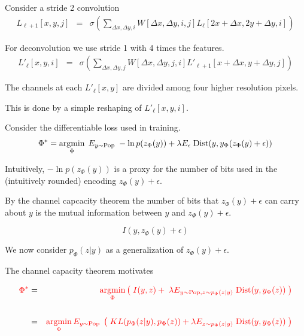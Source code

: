 {Consider a stride 2 convolution
\begin{eqnarray*}
  L_{\ell+1}[x,y,j] & = & \sigma\left(\sum_{\Delta x,\Delta y,i}   W[\Delta x, \Delta y, i,j] L_\ell[2x + \Delta x, 2y + \Delta y, i]\right)
\end{eqnarray*}

\vfill
For deconvolution we use stride 1 with 4 times the features.
\begin{eqnarray*}
  L'_\ell[x,y,i] & = & \sigma\left(\sum_{\Delta x,\Delta y,j}   W[\Delta x, \Delta y, j,i] L'_{\ell+1}[x + \Delta x, y + \Delta y, j]\right)
\end{eqnarray*}

\vfill
The channels at each $L'_\ell[x,y]$ are divided among four higher resolution pixels.

\vfill
This is done by a simple reshaping of $L'_\ell[x,y,i]$.


Consider the differentiable loss used in training.
{\color{red} $$\Phi^* = \operatorname*{argmin}_\Phi \;E_{y \sim \mathrm{Pop}}\;- \ln p(z_\Phi(y)) + \lambda E_\epsilon\; \mathrm{Dist}(y,y_\Phi(z_\Phi(y) + \epsilon))$$}

Intuitively, {\color{red} $- \ln p(z_\Phi(y))$} is a proxy for the number of bits used in the (intuitively rounded) encoding {\color{red} $z_\Phi(y) + \epsilon$}.

\vfill
By the channel capcacity theorem the number of bits that {\color{red} $z_\Phi(y) + \epsilon$} can carry about {\color{red} $y$}
is the mutual information between $y$ and $z_\Phi(y) + \epsilon$.

{\color{red} $$I(y,z_\Phi(y)+\epsilon)$$}


We now consider {\color{red} $p_\Phi(z|y)$} as a generalization of {\color{red} $z_\Phi(y) + \epsilon$}.

\vfill
The channel capacity theorem motivates

\vfill
{\huge
\begin{eqnarray*}
{\color{red} \Phi^*} & = & {\color{red} \operatorname*{argmin}_\Phi \left(\;I(y,z) + \;\lambda E_{y \sim \mathrm{Pop},z \sim p_\Phi(z|y)}\;\mathrm{Dist}(y,y_\Phi(z))\;\right)} \\
\\
& = & {\color{red} \operatorname*{argmin}_\Phi  E_{y \sim \mathrm{Pop}}\;\left(\;KL(p_\Phi(z|y),p_\Phi(z)) + \lambda E_{z \sim p_\Phi(z|y)}\; \mathrm{Dist}(y,y_\Phi(z))\;\right)} \\
\end{eqnarray*}
}

}
